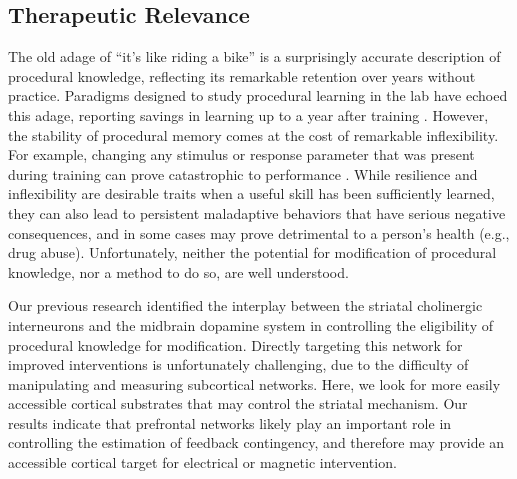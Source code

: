 \subsection*{Therapeutic Relevance}
The old adage of ``it's like riding a bike'' is a surprisingly accurate
description of procedural knowledge, reflecting its remarkable retention over
years without practice. Paradigms designed to study procedural learning in the
lab have echoed this adage, reporting savings in learning up to a year after
training \cite{Romano2010,turner_long-term_2012}. However, the stability of
procedural memory comes at the cost of remarkable inflexibility. For example,
changing any stimulus or response parameter that was present during training can
prove catastrophic to performance \cite{Rozanov_2010,Dienes_1997}. While
resilience and inflexibility are desirable traits when a useful skill has been
sufficiently learned, they can also lead to persistent maladaptive behaviors
that have serious negative consequences, and in some cases may prove detrimental
to a person's health (e.g., drug abuse). Unfortunately, neither the potential
for modification of procedural knowledge, nor a method to do so, are well
understood.

Our previous research identified the interplay between the striatal cholinergic
interneurons and the midbrain dopamine system in controlling the eligibility of
procedural knowledge for modification. Directly targeting this network for
improved interventions is unfortunately challenging, due to the difficulty of
manipulating and measuring subcortical networks. Here, we look for more easily
accessible cortical substrates that may control the striatal mechanism. Our
results indicate that prefrontal networks likely play an important role in
controlling the estimation of feedback contingency, and therefore may provide an
accessible cortical target for electrical or magnetic intervention.